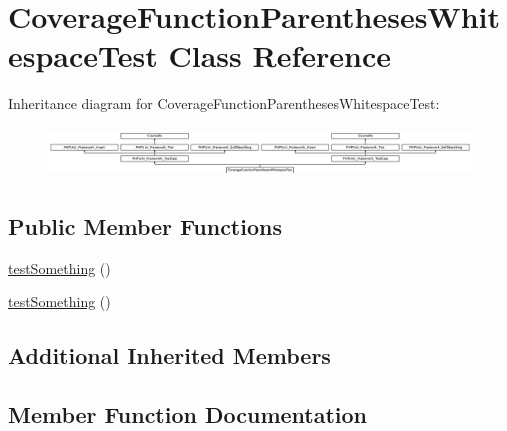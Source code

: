 \hypertarget{class_coverage_function_parentheses_whitespace_test}{}\section{Coverage\+Function\+Parentheses\+Whitespace\+Test Class Reference}
\label{class_coverage_function_parentheses_whitespace_test}
Inheritance diagram for Coverage\+Function\+Parentheses\+Whitespace\+Test\+:\begin{figure}[H]
\begin{center}
\leavevmode
\includegraphics[height=1.319199cm]{class_coverage_function_parentheses_whitespace_test}
\end{center}
\end{figure}
\subsection*{Public Member Functions}
\begin{DoxyCompactItemize}
\item 
\mbox{\hyperlink{class_coverage_function_parentheses_whitespace_test_a0fc4e17369bc9607ebdd850d9eda8167}{test\+Something}} ()
\item 
\mbox{\hyperlink{class_coverage_function_parentheses_whitespace_test_a0fc4e17369bc9607ebdd850d9eda8167}{test\+Something}} ()
\end{DoxyCompactItemize}
\subsection*{Additional Inherited Members}


\subsection{Member Function Documentation}
\mbox{\label{class_coverage_function_parentheses_whitespace_test_a0fc4e17369bc9607ebdd850d9eda8167}} 
